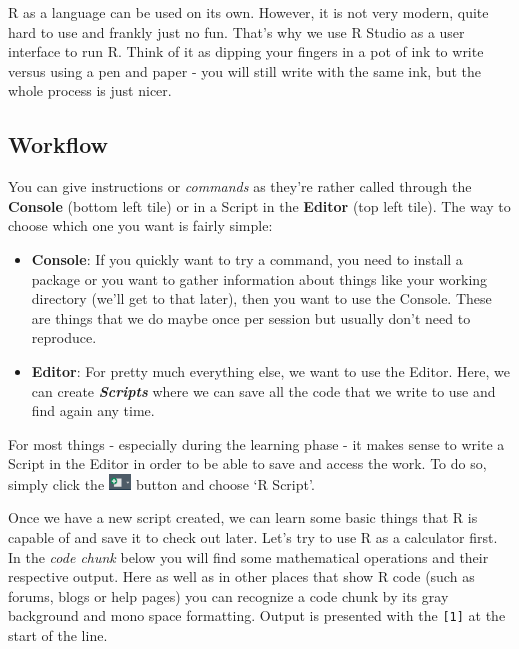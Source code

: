\documentclass[
]{book}
\providecommand{\tightlist}{%
  \setlength{\itemsep}{0pt}\setlength{\parskip}{0pt}}
\begin{document}
R as a language can be used on its own.
However, it is not very modern, quite hard to use and frankly just no fun.
That's why we use R Studio as a user interface to run R.
Think of it as dipping your fingers in a pot of ink to write versus using a pen and paper - you will still write with the same ink, but the whole process is just nicer.

\subsection{Workflow}\label{workflow}

You can give instructions or \emph{commands} as they're rather called through the \textbf{Console} (bottom left tile) or in a Script in the \textbf{Editor} (top left tile).
The way to choose which one you want is fairly simple:

\begin{itemize}
\tightlist
\item
  \textbf{Console}: If you quickly want to try a command, you need to install a package or you want to gather information about things like your working directory (we'll get to that later), then you want to use the Console. These are things that we do maybe once per session but usually don't need to reproduce.
\item
  \textbf{Editor}: For pretty much everything else, we want to use the Editor. Here, we can create \textbf{\emph{Scripts}} where we can save all the code that we write to use and find again any time.
\end{itemize}

For most things - especially during the learning phase - it makes sense to write a Script in the Editor in order to be able to save and access the work.
To do so, simply click the \includegraphics[width=\textwidth,height=0.16667in]{./img/newfile.png} button and choose `R Script'.

Once we have a new script created, we can learn some basic things that R is capable of and save it to check out later.
Let's try to use R as a calculator first.
In the \emph{code chunk} below you will find some mathematical operations and their respective output.
Here as well as in other places that show R code (such as forums, blogs or help pages) you can recognize a code chunk by its gray background and mono space formatting.
Output is presented with the \texttt{{[}1{]}} at the start of the line.
\end{document}
